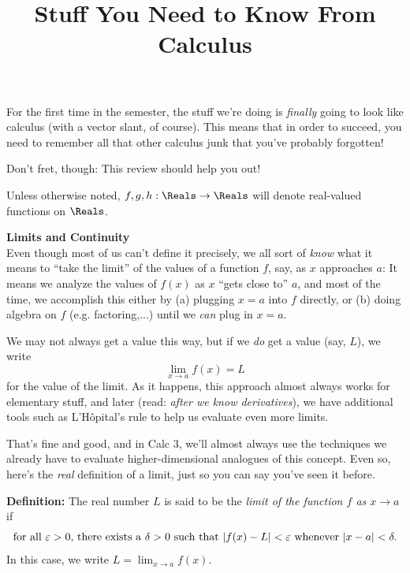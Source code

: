 \documentclass[12pt]{article}
\title{\vspace{-0.75in}\LARGE{Stuff You Need to Know From Calculus}\vspace{-0.5in}}
\date{}
\newcommand{\sectitle}[1]{\vspace{7.5mm}\noindent\textbf{\Large{#1}}\\[3mm]}
\newcommand{\LH}{L'H\^{o}pital}
\begin{document}
	\maketitle
	
	\noindent For the first time in the semester, the stuff we're doing is \textit{finally} going to look like calculus (with a vector slant, of course). This means that in order to succeed, you need to remember all that other calculus junk that you've probably forgotten!
	
	Don't fret, though: This review should help you out!
	
	Unless otherwise noted, $f,g,h:\Reals\to\Reals$ will denote real-valued functions on $\Reals$.

	\sectitle{Limits and Continuity}
	Even though most of us can't define it precisely, we all sort of \textit{know} what it means to ``take the limit'' of the values of a function $f$, say, as $x$ approaches $a$: It means we analyze the values of $f(x)$ as $x$ ``gets close to'' $a$, and most of the time, we accomplish this either by (a) plugging $x=a$ into $f$ directly, or (b) doing algebra on $f$ (e.g. factoring,...) until we \textit{can} plug in $x=a$. 
	
	We may not always get a value this way, but if we \textit{do} get a value (say, $L$), we write
	$$\lim_{x\to a}f(x)=L$$
	for the value of the limit. As it happens, this approach almost always works for elementary stuff, and later (read: \textit{after we know derivatives}), we have additional tools such as \LH's rule to help us evaluate even more limits.
	
	That's fine and good, and in Calc 3, we'll almost always use the techniques we already have to evaluate higher-dimensional analogues of this concept. Even so, here's the \textit{real} definition of a limit, just so you can say you've seen it before.\vspace{6mm}
		
	\noindent\textbf{Definition:} The real number $L$ is said to be the \textit{limit of the function $f$ as $x\to a$} if
	\begin{equation}
		\label{eq:limdef}
		\text{for all }\varepsilon>0\text{, there exists a }\delta>0\text{ such that }|f(x)-L|<\varepsilon\text{ whenever }|x-a|<\delta.
	\end{equation}
	In this case, we write $L=\lim_{x\to a}f(x)$.\vspace{3mm}
	
\end{document}
